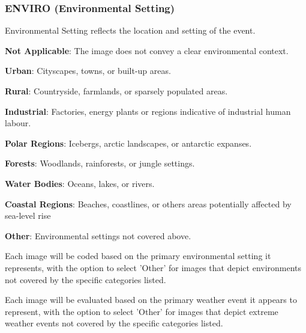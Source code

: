 \subsubsection*{ENVIRO (Environmental Setting)}
\label{subsubsec:environmental-setting}
Environmental Setting reflects the location and setting of the event.
\begin{description}[leftmargin=2.5cm, style=multiline, labelwidth=1.5cm]
\item[0] \textbf{Not Applicable}: The image does not convey a clear environmental context.
\item[1] \textbf{Urban}: Cityscapes, towns, or built-up areas.
\item[2] \textbf{Rural}: Countryside, farmlands, or sparsely populated areas.
\item[3] \textbf{Industrial}: Factories, energy plants or regions indicative of industrial human labour.
\item[4] \textbf{Polar Regions}: Icebergs, arctic landscapes, or antarctic expanses.
\item[5] \textbf{Forests}: Woodlands, rainforests, or jungle settings.
\item[6] \textbf{Water Bodies}: Oceans, lakes, or rivers.
\item[7] \textbf{Coastal Regions}: Beaches, coastlines, or others areas potentially affected by sea-level rise
\item[8] \textbf{Other}: Environmental settings not covered above.
\end{description}

Each image will be coded based on the primary environmental setting it represents, with the option to select 'Other' for images that depict environments not covered by the specific categories listed.

\noindent
Each image will be evaluated based on the primary weather event it appears to represent, with the option to select 'Other' for images that depict extreme weather events not covered by the specific categories listed.

